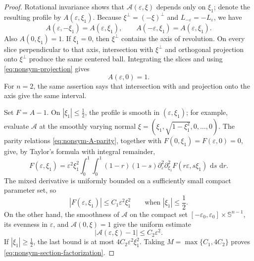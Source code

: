 \documentclass[11pt]{article}
\theoremstyle{remark}
\newcommand{\Sph}{\mathbb{S}}
\newcommand{\dd}{\,\mathrm{d}}
\begin{document}
\begin{proof}
Rotational invariance shows that $\mathcal A(\varepsilon,\xi)$ depends only
on $\xi_1$; denote the resulting profile by $A(\varepsilon,\xi_1)$.
Because $\xi^\perp=(-\xi)^\perp$ and
$L_{-\varepsilon}=-L_\varepsilon$, we have
\begin{equation}\label{eq:nonsym-A-parity}
 A(\varepsilon,-\xi_1)=A(\varepsilon,\xi_1),
 \qquad
 A(-\varepsilon,\xi_1)=A(\varepsilon,\xi_1).
\end{equation}
Also $A(0,\xi_1)=1$.  If $\xi_1=0$, then $\xi^\perp$ contains the
axis of revolution.  On every slice perpendicular to that axis,
intersection with $\xi^\perp$ and orthogonal projection onto
$\xi^\perp$ produce the same centered ball.  Integrating the slices and
using \eqref{eq:nonsym-projection} gives
\begin{equation}\label{eq:nonsym-A-axis}
 A(\varepsilon,0)=1.
\end{equation}
For $n=2$, the same assertion says that intersection with and projection
onto the axis give the same interval.

Set $F=A-1$.  On $|\xi_1|\leq\frac12$, the profile is smooth in
$(\varepsilon,\xi_1)$; for example, evaluate $\mathcal A$ at the smoothly
varying normal $
 \xi=(\xi_1,\sqrt{1-\xi_1^2},0,\ldots,0)$.
The parity relations \eqref{eq:nonsym-A-parity}, together with
$F(0,\xi_1)=F(\varepsilon,0)=0$, give, by Taylor's formula with integral
remainder,
\[
 F(\varepsilon,\xi_1)
 =\varepsilon^2\xi_1^2\int_0^1\!\int_0^1
 (1-r)(1-s)
 \partial_\varepsilon^2\partial_{\xi_1}^2
 F(r\varepsilon,s\xi_1)\,\dd s\,\dd r.
\]
The mixed derivative is uniformly bounded on a sufficiently small compact
parameter set, so
\begin{equation}\label{eq:nonsym-local-factor}
 |F(\varepsilon,\xi_1)|\leq C_1\varepsilon^2\xi_1^2
 \qquad\text{when }|\xi_1|\leq\frac12.
\end{equation}
On the other hand, the smoothness of $\mathcal A$ on the compact set
$[-\varepsilon_0,\varepsilon_0]\times\Sph^{n-1}$, its evenness in
$\varepsilon$, and $\mathcal A(0,\xi)=1$ give the uniform estimate
\[
 |\mathcal A(\varepsilon,\xi)-1|\leq C_2\varepsilon^2.
\]
If $|\xi_1|\geq\frac12$, the last bound is at most
$4C_2\varepsilon^2\xi_1^2$.  Taking
$M=\max\{C_1,4C_2\}$ proves
\eqref{eq:nonsym-section-factorization}.  
\end{proof}
\end{document}
